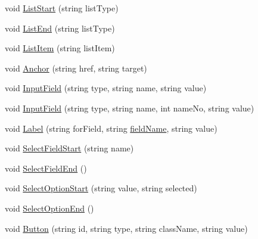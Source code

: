 \begin{DoxyCompactItemize}
\item 
void \hyperlink{classPageStructureMaker_ac24ce26202757aaa30402155daf8a3d0}{List\-Start} (string list\-Type)
\item 
void \hyperlink{classPageStructureMaker_a8578b1555ad2fc92a9efc7dbf7d1fe87}{List\-End} (string list\-Type)
\item 
void \hyperlink{classPageStructureMaker_adf4116e526026edc3c8a3bcf96a7e929}{List\-Item} (string list\-Item)
\item 
void \hyperlink{classPageStructureMaker_a8c0fae5b599182863066de56ae0cea42}{Anchor} (string href, string target)
\item 
void \hyperlink{classPageStructureMaker_a928ea6f84a8f7833c128034068a4b9a7}{Input\-Field} (string type, string name, string value)
\item 
void \hyperlink{classPageStructureMaker_a3547027801e298307527f1e934787b13}{Input\-Field} (string type, string name, int name\-No, string value)
\item 
void \hyperlink{classPageStructureMaker_ae49979cb49bf320cbdf244bce07fbf9e}{Label} (string for\-Field, string \hyperlink{classInputDetail_ac6f85380c5152c406d483726382c4798}{field\-Name}, string value)
\item 
void \hyperlink{classPageStructureMaker_ae8684bb66ca463e2f92e09c96137f9e3}{Select\-Field\-Start} (string name)
\item 
void \hyperlink{classPageStructureMaker_a81eb3cdbc840a4c8165cef87330ade09}{Select\-Field\-End} ()
\item 
void \hyperlink{classPageStructureMaker_a77856078e74dab25329132ea07466f92}{Select\-Option\-Start} (string value, string selected)
\item 
void \hyperlink{classPageStructureMaker_a7682f479f7f1012d426ec9f9535def60}{Select\-Option\-End} ()
\item 
void \hyperlink{classPageStructureMaker_a419feca1cfdb50e1be757eb1c2707a73}{Button} (string id, string type, string class\-Name, string value)
\end{DoxyCompactItemize}
